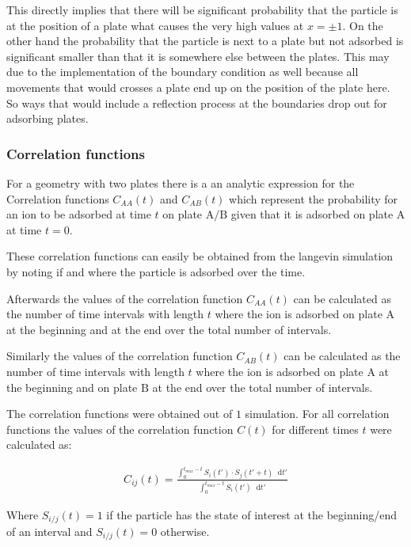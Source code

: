 \documentclass[a4paper, parskip=half]{scrartcl}
\newcommand{\diff}{\mathop{}\!\mathrm{d}}
\begin{document}
This directly implies that there will be significant probability that the particle is at the position of a plate what causes the very high values at $x = \pm 1$. On the other hand the probability that the particle is next to a plate but not adsorbed is significant smaller than that it is somewhere else between the plates. This may due to the implementation of the boundary condition as well because all movements that would crosses a plate end up on the position of the plate here. So ways that would include a reflection process at the boundaries drop out for adsorbing plates. 


\subsubsection{Correlation functions}
For a geometry with two plates there is a an analytic expression for the Correlation functions $C_{AA}(t)$ and $C_{AB}(t)$ which represent the probability for an ion to be adsorbed at time $t$ on plate $\mathrm{A}/\mathrm{B}$ given that it is adsorbed on plate $\mathrm{A}$ at time $t=0$.

These correlation functions can easily be obtained from the langevin simulation by noting if and where the particle is adsorbed over the time. 

Afterwards the values of the correlation function $C_{AA}(t)$ can be calculated as the number of time intervals with length $t$ where the ion is adsorbed on plate $\mathrm{A}$ at the beginning and at the end over the total number of intervals.

Similarly the values of the correlation function $C_{AB}(t)$ can be calculated as the number of time intervals with length $t$ where the ion is adsorbed on plate $\mathrm{A}$ at the beginning and on plate $\mathrm{B}$ at the end over the total number of intervals.

The correlation functions were obtained out of $1$ simulation. For all correlation functions the values of the correlation function $C(t)$ for different times $t$ were calculated as:

\begin{align}
  C_{ij}(t) = \frac{\int_0^{t_{max}-t} S_i(t') \cdot S_j(t' + t) \diff t'}{\int_0^{t_{max}-t} S_i(t') \diff t'}
\end{align}

Where $S_{i/j}(t) = 1$ if the particle has the state of interest at the beginning/end of an interval and $S_{i/j}(t) = 0$ otherwise.
\end{document}
